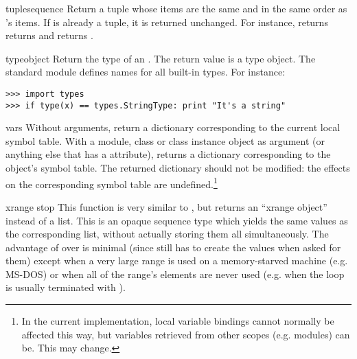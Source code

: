 \begin{funcdesc}{tuple}{sequence}
Return a tuple whose items are the same and in the same order as
's items.  If  is already a tuple, it
is returned unchanged.  For instance,  returns
returns  and  returns
.
\end{funcdesc}

\begin{funcdesc}{type}{object}
Return the type of an .  The return value is a type
object.  The standard module  defines names for all
built-in types.
For instance:

\begin{verbatim}
>>> import types
>>> if type(x) == types.StringType: print "It's a string"
\end{verbatim}
\end{funcdesc}

\begin{funcdesc}{vars}{}
Without arguments, return a dictionary corresponding to the current
local symbol table.  With a module, class or class instance object as
argument (or anything else that has a  attribute),
returns a dictionary corresponding to the object's symbol table.
The returned dictionary should not be modified: the effects on the
corresponding symbol table are undefined.\footnote{
  In the current implementation, local variable bindings cannot
  normally be affected this way, but variables retrieved from 
  other scopes (e.g. modules) can be.  This may change.}
\end{funcdesc}

\begin{funcdesc}{xrange}{ stop}
This function is very similar to , but returns an
``xrange object'' instead of a list.  This is an opaque sequence type
which yields the same values as the corresponding list, without
actually storing them all simultaneously.  The advantage of
 over  is minimal (since
 still has to create the values when asked for
them) except when a very large range is used on a memory-starved
machine (e.g. MS-DOS) or when all of the range's elements are never
used (e.g. when the loop is usually terminated with ).
\end{funcdesc}
